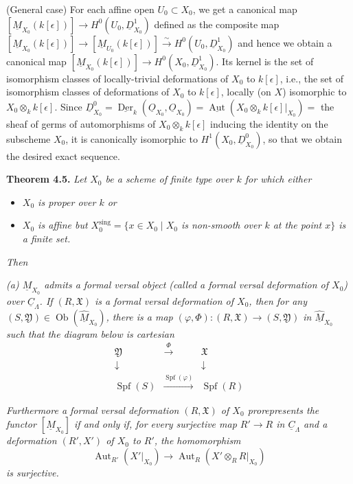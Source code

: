 \documentclass[11pt]{article}
\theoremstyle{plain}
\theoremstyle{definition}
\theoremstyle{remark}
\DeclareMathOperator{\Spf}{Spf}
\DeclareMathOperator{\Aut}{Aut}
\DeclareMathOperator{\Der}{Der}
\DeclareMathOperator{\ob}{Ob}
\begin{document}
(General case) For each affine open $U_0 \subset X_0$, we get a canonical map $[\underline{M}_{X_0}(k[\epsilon])] \to H^0(U_0, \underline{D}_{X_0}^1)$ defined as the composite map $[\underline{M}_{X_0}(k[\epsilon])] \to [\underline{M}_{U_0}(k[\epsilon])] \xrightarrow{\sim} H^0(U_0, \underline{D}_{X_0}^1)$ and hence we obtain a canonical map $[\underline{M}_{X_0}(k[\epsilon])] \to H^0(X_0, \underline{D}_{X_0}^1)$. Its kernel is the set of isomorphism classes of locally-trivial deformations of $X_0$ to $k[\epsilon]$, i.e., the set of isomorphism classes of deformations of $X_0$ to $k[\epsilon]$, locally (on $X$) isomorphic to $X_0 \otimes_k k[\epsilon]$. Since $\underline{D}_{X_0}^0 = \underline{\Der}_k(\underline{O}_{X_0}, \underline{O}_{X_0}) = \underline{\Aut}(X_0 \otimes_k k[\epsilon]|_{X_0}) = {}$ the sheaf of germs of automorphisms of $X_0 \otimes_k k[\epsilon]$ inducing the identity on the subscheme $X_0$, it is canonically isomorphic to $H^1(X_0, \underline{D}_{X_0}^0)$, so that we obtain the desired exact sequence.

\medskip
\noindent\textbf{Theorem 4.5.} \textit{Let $X_0$ be a scheme of finite type over $k$ for which either}
\begin{itemize}
\item[(i)] \textit{$X_0$ is proper over $k$ or}
\item[(ii)] \textit{$X_0$ is affine but $X_0^{\mathrm{sing}} = \{x \in X_0 \mid X_0$ is non-smooth over $k$ at the point $x\}$ is a finite set.}
\end{itemize}
\textit{Then}

\textit{(a) $\underline{M}_{X_0}$ admits a formal versal object (called a formal versal deformation of $X_0$) over $\underline{C}_\Lambda$. If $(R, \mathfrak{X})$ is a formal versal deformation of $X_0$, then for any $(S, \mathfrak{Y}) \in \ob(\widehat{\underline{M}}_{X_0})$, there is a map $(\varphi,\Phi) : (R,\mathfrak{X}) \to (S,\mathfrak{Y})$ in $\widehat{\underline{M}}_{X_0}$ such that the diagram below is cartesian}
\[
\begin{array}{ccc}
\mathfrak{Y} & \xrightarrow{\Phi} & \mathfrak{X} \\
\downarrow & & \downarrow \\
\Spf(S) & \xrightarrow{\Spf(\varphi)} & \Spf(R)
\end{array}
\]

\textit{Furthermore a formal versal deformation $(R,\mathfrak{X})$ of $X_0$ prorepresents the functor $[\underline{M}_{X_0}]$ if and only if, for every surjective map $R' \to R$ in $\underline{C}_\Lambda$ and a deformation $(R', X')$ of $X_0$ to $R'$, the homomorphism}
\[\Aut_{R'}(X'|_{X_0}) \to \Aut_R(X' \otimes_R R|_{X_0})\]
\textit{is surjective.}
\end{document}
